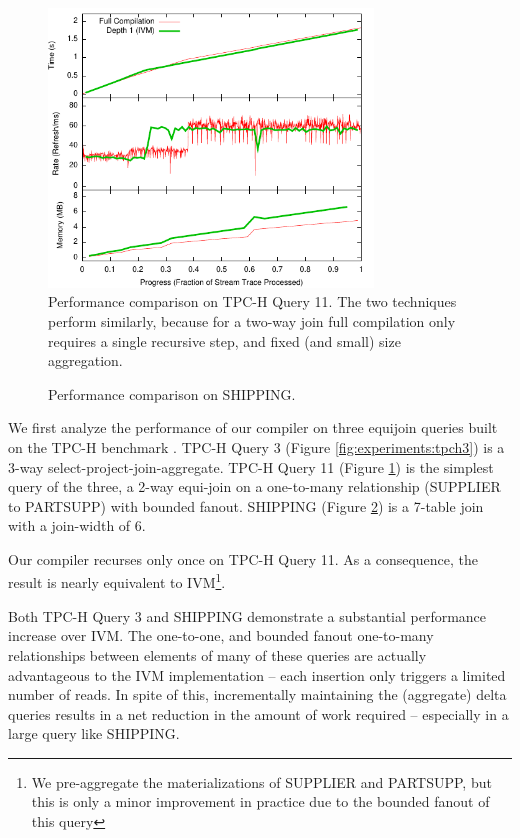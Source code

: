 \begin{figure}
\begin{center}
\includegraphics[width=3.4in]{../graphs/graphs/unified_tpch11.pdf}
\caption{Performance comparison on TPC-H Query 11.  The two techniques perform similarly, because for a two-way join full compilation only requires a single recursive step, and fixed (and small) size aggregation.}
\label{fig:experiments:tpch11}
\end{center}
\end{figure}

\begin{figure}
\begin{center}
\caption{Performance comparison on SHIPPING.}
\label{fig:experiments:ssb4}
\end{center}
\end{figure}

We first analyze the performance of our compiler on three equijoin queries built on the TPC-H benchmark .  TPC-H Query 3 (Figure \ref{fig:experiments:tpch3}) is a 3-way select-project-join-aggregate.  TPC-H Query 11 (Figure \ref{fig:experiments:tpch11}) is the simplest query of the three, a 2-way equi-join on a one-to-many relationship (SUPPLIER to PARTSUPP) with bounded fanout.  SHIPPING (Figure \ref{fig:experiments:ssb4}) is a 7-table join with a join-width of 6.  

Our compiler recurses only once on TPC-H Query 11.  As a consequence, the result is nearly equivalent to IVM\footnote{We pre-aggregate the materializations of SUPPLIER and PARTSUPP, but this is only a minor improvement in practice due to the bounded fanout of this query}.  

Both TPC-H Query 3 and SHIPPING demonstrate a substantial performance increase over IVM.  The one-to-one, and bounded fanout one-to-many relationships between elements of many of these queries are actually advantageous to the IVM implementation -- each insertion only triggers a limited number of reads.  In spite of this, incrementally maintaining the (aggregate) delta queries results in a net reduction in the amount of work required -- especially in a large query like SHIPPING.

